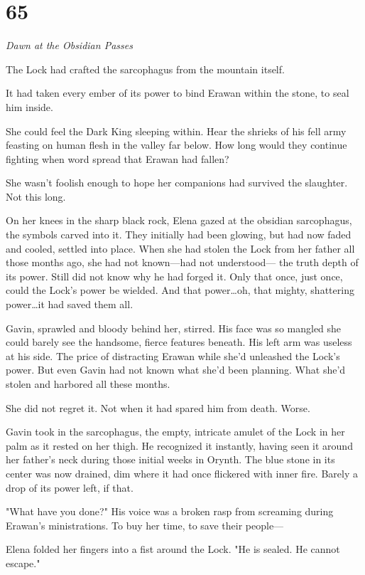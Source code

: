 
\chapter{65}

\emph{Dawn at the Obsidian Passes}

The Lock had crafted the sarcophagus from the mountain itself.

It had taken every ember of its power to bind Erawan within the stone, to seal him inside.

She could feel the Dark King sleeping within.
Hear the shrieks of his fell army feasting on human flesh in the valley far below.
How long would they continue fighting when word spread that Erawan had fallen?

She wasn't foolish enough to hope her companions had survived the slaughter.
Not this long.

On her knees in the sharp black rock, Elena gazed at the obsidian sarcophagus, the symbols carved into it.
They initially had been glowing, but had now faded and cooled, settled into place.
When she had stolen the Lock from her father all those months ago, she had not known---had not understood--- the truth depth of its power.
Still did not know why he had forged it.
Only that once, just once, could the Lock's power be wielded.
And that power\ldots oh, that mighty, shattering power\ldots it had saved them all.

Gavin, sprawled and bloody behind her, stirred.
His face was so mangled she could barely see the handsome, fierce features beneath.
His left arm was useless at his side.
The price of distracting Erawan while she'd unleashed the Lock's power.
But even Gavin had not known what she'd been planning.
What she'd stolen and harbored all these months.

She did not regret it.
Not when it had spared him from death.
Worse.

Gavin took in the sarcophagus, the empty, intricate amulet of the Lock in her palm as it rested on her thigh.
He recognized it instantly, having seen it around her father's neck during those initial weeks in Orynth.
The blue stone in its center was now drained, dim where it had once flickered with inner fire.
Barely a drop of its power left, if that.

"What have you done?"
His voice was a broken rasp from screaming during Erawan's ministrations.
To buy her time, to save their people---

Elena folded her fingers into a fist around the Lock.
"He is sealed.
He cannot escape."


